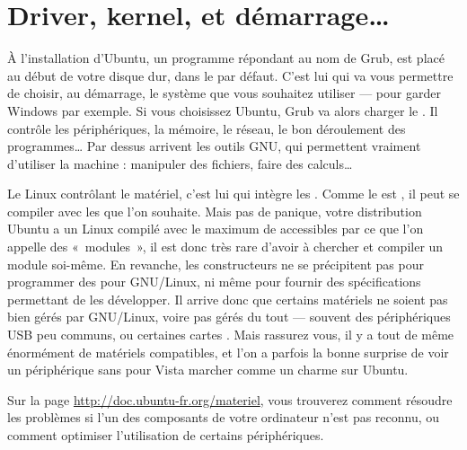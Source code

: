 \section{Driver, kernel, et démarrage\ldots{}}
À l'installation d'Ubuntu, un programme répondant au nom de Grub, est placé au début de votre disque dur, dans le  par défaut. C'est lui qui va vous permettre de choisir, au démarrage, le système que vous souhaitez utiliser --- pour garder Windows par exemple. Si vous choisissez Ubuntu, Grub va alors charger le . Il contrôle les périphériques, la mémoire, le réseau, le bon déroulement des programmes\ldots{} Par dessus arrivent les outils GNU, qui permettent vraiment d'utiliser la machine : manipuler des fichiers, faire des calculs\ldots{} \par
Le  Linux contrôlant le matériel, c'est lui qui intègre les . Comme le  est , il peut se compiler avec les  que l'on souhaite. Mais pas de panique, votre distribution Ubuntu a un  Linux compilé avec le maximum de  accessibles par ce que l'on appelle des «~modules~», il est donc très rare d'avoir à chercher et compiler un module soi-même. En revanche, les constructeurs ne se précipitent pas pour programmer des  pour GNU/Linux, ni même pour fournir des spécifications permettant de les développer. Il arrive donc que certains matériels ne soient pas bien gérés par GNU/Linux, voire pas gérés du tout --- souvent des périphériques USB peu communs, ou certaines cartes . Mais rassurez vous, il y a tout de même énormément de matériels compatibles, et l'on a parfois la bonne surprise de voir un périphérique sans  pour Vista marcher comme un charme sur Ubuntu.
\begin{nota}
Sur la page \url{http://doc.ubuntu-fr.org/materiel}, vous trouverez comment résoudre les problèmes si l'un des composants de votre ordinateur n'est pas reconnu, ou comment optimiser l'utilisation de certains périphériques.
\end{nota}
